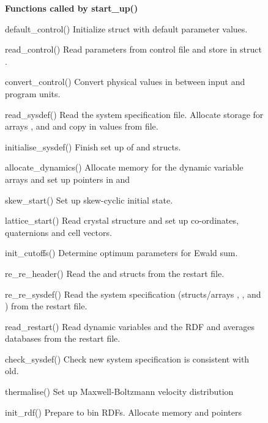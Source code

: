 \documentclass[a4paper,twoside]{report}
\begin{document}
\begin{figure}[tb]
\noindent
\begin{minipage}[b]{260bp}

\end{minipage}
\begin{minipage}[b]{2.55in}
\raggedright
\textbf{Functions called by start\_up()}\\
\footnotesize
\setlength{\leftmargini}{1em}
\begin{Litdescription}
\item[default\_control()] Initialize struct  with
  default parameter values.
\item[read\_control()] Read parameters from control file and store in struct
  .
\item[convert\_control()] Convert physical values in 
  between input and program units.
\item[read\_sysdef()] Read the system specification file. Allocate
  storage for arrays ,  and
   and copy in values from file.
\item[initialise\_sysdef()] Finish set up of  and
   structs.
\item[allocate\_dynamics()] Allocate memory for the dynamic variable
  arrays and set up pointers in  and 
\item[skew\_start()] Set up skew-cyclic initial state.
\item[lattice\_start()] Read crystal structure and set up
  co-ordinates, quaternions and cell vectors.
\item[init\_cutoffs()] Determine optimum parameters for Ewald sum.
\item[re\_re\_header()] Read the  and 
  structs from the restart file.                                        
\item[re\_re\_sysdef()] Read the system specification (structs/arrays
  , ,  and
  ) from the restart file.
\item[read\_restart()] Read dynamic variables and the RDF and averages
  databases from the restart file.
\item[check\_sysdef()] Check new system specification is consistent
  with old.
\item[thermalise()] Set up Maxwell-Boltzmann velocity distribution
\item[init\_rdf()] Prepare to bin RDFs.  Allocate memory and pointers

\end{Litdescription}
\end{minipage}
\end{figure}
\end{document}
